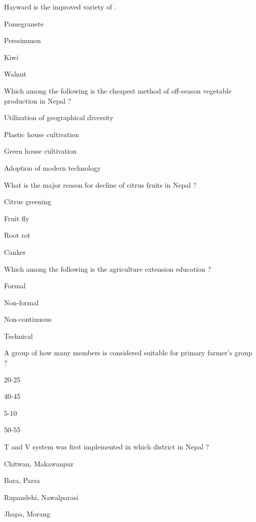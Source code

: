 \begin{questions}
\question Hayward is the improved variety of \fillin[][3cm].
  \begin{items}
  \item Pomegranete
  \item Perssimmon
  \item* Kiwi
  \item Walnut
  \end{items}

\question Which among the following is the cheapest method of off-season vegetable production in Nepal ?
  \begin{items}
  \item* Utilization of geographical diversity
  \item Plastic house cultivation
  \item Green house cultivation
  \item Adoption of modern technology
  \end{items}

\question What is the major reason for decline of citrus fruits in Nepal ?
  \begin{items}
  \item* Citrus greening
  \item Fruit fly
  \item Root rot
  \item Canker
  \end{items}

\question Which among the following is the agriculture extension education ?
  \begin{items}
  \item Formal
  \item* Non-formal
  \item Non-continuous
  \item Technical
  \end{items}

\question A group of how many members is considered suitable for primary farmer's group ?
  \begin{items}
  \item* 20-25
  \item 40-45
  \item 5-10
  \item 50-55
  \end{items}

\question T and V system was first implemented in which district in Nepal ?
  \begin{items}
  \item Chitwan, Makawanpur
  \item* Bara, Parsa
  \item Rupandehi, Nawalparasi
  \item Jhapa, Morang
  \end{items}


\end{questions}
